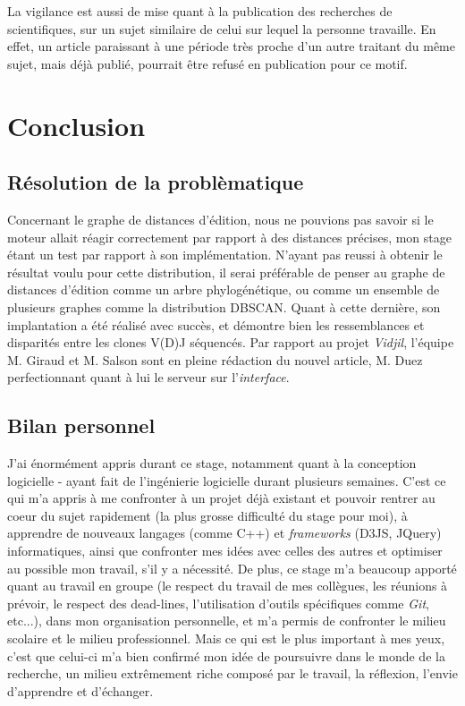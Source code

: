 \documentclass[pdftex,12pt,a4paper]{report}
\begin{document}
\begin{spacing}{1.2}
La vigilance est aussi de mise quant à la publication des recherches de scientifiques, sur un sujet similaire de celui sur lequel la personne travaille. En effet, un article paraissant à une période très proche d'un autre traitant du même sujet, mais déjà publié, pourrait être refusé en publication pour ce motif.

\chapter*{Conclusion}


\section*{Résolution de la problèmatique}

Concernant le graphe de distances d'édition, nous ne pouvions pas savoir si le moteur allait réagir correctement par rapport à des distances précises, mon stage étant un test par rapport à son implémentation. N'ayant pas reussi à obtenir le résultat voulu pour cette distribution, il serai préférable de penser au graphe de distances d'édition comme un arbre phylogénétique, ou comme un ensemble de plusieurs graphes comme la distribution DBSCAN. Quant à cette dernière, son implantation a été réalisé avec succès, et démontre bien les ressemblances et disparités entre les clones V(D)J séquencés. Par rapport au projet \textit{Vidjil}, l'équipe M. Giraud et M. Salson sont en pleine rédaction du nouvel article, M. Duez perfectionnant quant à lui le serveur sur l'\textit{interface}.

\section*{Bilan personnel}

J'ai énormément appris durant ce stage, notamment quant à la conception logicielle - ayant fait de l'ingénierie logicielle durant plusieurs semaines. C'est ce qui m'a appris à me confronter à un projet déjà existant et pouvoir rentrer au coeur du sujet rapidement (la plus grosse difficulté du stage pour moi), à apprendre de nouveaux langages (comme C++) et \textit{frameworks} (D3JS, JQuery) informatiques, ainsi que confronter mes idées avec celles des autres et optimiser au possible mon travail, s'il y a nécessité. De plus, ce stage m'a beaucoup apporté quant au travail en groupe (le respect du travail de mes collègues, les réunions à prévoir, le respect des dead-lines, l'utilisation d'outils spécifiques comme \textit{Git}, etc...), dans mon organisation personnelle, et m'a permis de confronter le milieu scolaire et le milieu professionnel.
Mais ce qui est le plus important à mes yeux, c'est que celui-ci m'a bien confirmé mon idée de poursuivre dans le monde de la recherche, un milieu extrêmement riche composé par le travail, la réflexion, l'envie d'apprendre et d'échanger.


\end{spacing}
\end{document}
